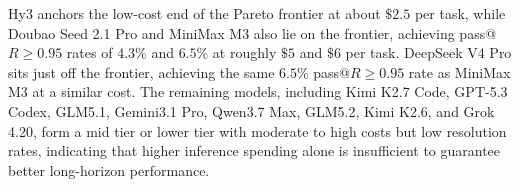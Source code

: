 Hy3 anchors the low-cost end of the Pareto frontier at about $\$2.5$ per task, while Doubao Seed 2.1 Pro and MiniMax M3 also lie on the frontier, achieving pass@$R\geq0.95$ rates of $4.3\%$ and $6.5\%$ at roughly $\$5$ and $\$6$ per task.
DeepSeek V4 Pro sits just off the frontier, achieving the same $6.5\%$ pass@$R\geq0.95$ rate as MiniMax M3 at a similar cost. The remaining models, including Kimi K2.7 Code, GPT-5.3 Codex, GLM5.1, Gemini3.1 Pro, Qwen3.7 Max, GLM5.2, Kimi K2.6, and Grok 4.20, form a mid tier or lower tier with moderate to high costs but low resolution rates, indicating that higher inference spending alone is insufficient to guarantee better long-horizon performance.





